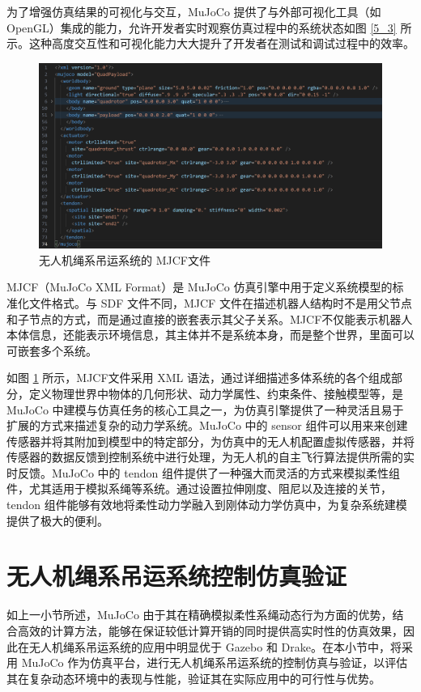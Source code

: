 \documentclass[lang=chs, degree=master, blindreview=true, winfonts=true]{yanputhesis}
\begin{document}
为了增强仿真结果的可视化与交互，MuJoCo 提供了与外部可视化工具（如 OpenGL）集成的能力，允许开发者实时观察仿真过程中的系统状态如图 \ref{5_3} 所示。这种高度交互性和可视化能力大大提升了开发者在测试和调试过程中的效率。

\begin{figure}[hbt!]
	\centering
	\includegraphics[width=36pc]{picture/MJCF.png} 
	\caption{无人机绳系吊运系统的 MJCF文件} 
	\label{MJCF}
\end{figure}
MJCF（MuJoCo XML Format）是 MuJoCo 仿真引擎中用于定义系统模型的标准化文件格式。与 SDF 文件不同，MJCF 文件在描述机器人结构时不是用父节点和子节点的方式，而是通过直接的嵌套表示其父子关系。MJCF不仅能表示机器人本体信息，还能表示环境信息，其主体并不是系统本身，而是整个世界，里面可以可嵌套多个系统。

如图 \ref{MJCF} 所示，MJCF文件采用 XML 语法，通过详细描述多体系统的各个组成部分，定义物理世界中物体的几何形状、动力学属性、约束条件、接触模型等，是 MuJoCo 中建模与仿真任务的核心工具之一，为仿真引擎提供了一种灵活且易于扩展的方式来描述复杂的动力学系统。MuJoCo 中的 sensor 组件可以用来来创建传感器并将其附加到模型中的特定部分，为仿真中的无人机配置虚拟传感器，并将传感器的数据反馈到控制系统中进行处理，为无人机的自主飞行算法提供所需的实时反馈。MuJoCo 中的 tendon 组件提供了一种强大而灵活的方式来模拟柔性组件，尤其适用于模拟系绳等系统。通过设置拉伸刚度、阻尼以及连接的关节，tendon 组件能够有效地将柔性动力学融入到刚体动力学仿真中，为复杂系统建模提供了极大的便利。


\section{无人机绳系吊运系统控制仿真验证}
如上一小节所述，MuJoCo 由于其在精确模拟柔性系绳动态行为方面的优势，结合高效的计算方法，能够在保证较低计算开销的同时提供高实时性的仿真效果，因此在无人机绳系吊运系统的应用中明显优于 Gazebo 和 Drake。在本小节中，将采用 MuJoCo 作为仿真平台，进行无人机绳系吊运系统的控制仿真与验证，以评估其在复杂动态环境中的表现与性能，验证其在实际应用中的可行性与优势。
\end{document}

